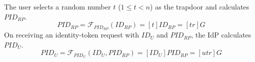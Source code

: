 \vspace{0.5mm}
 The user selects a random number $t$ ($1 \leq t <n$) as the trapdoor
         and calculates $PID_{RP}$.
\begin{equation}
PID_{RP} = \mathcal{F}_{PID_{RP}}(ID_{RP}) = [t]{ID_{RP}} = [tr]G
\label{equ:PIDRP}
\end{equation}
%
%
%
On receiving an identity-token request with $ID_U$ and $PID_{RP}$,
    the IdP calculates $PID_{U}$.
\begin{equation}
PID_{U} = \mathcal{F}_{PID_U}(ID_U, PID_{RP}) =
  [{ID_U}]{PID_{RP}} = [utr]G
 \label{equ:PIDU}
\end{equation}



